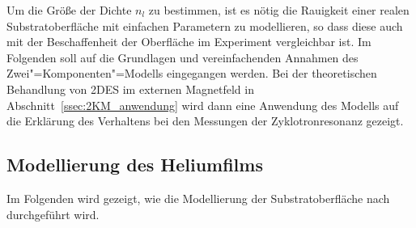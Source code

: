 Um die Größe der Dichte $n_l$ zu bestimmen, ist es nötig die Rauigkeit einer realen Substratoberfläche mit einfachen Parametern zu modellieren, so dass diese auch mit der Beschaffenheit der Oberfläche im Experiment vergleichbar ist. Im Folgenden soll auf die Grundlagen und vereinfachenden Annahmen des Zwei"=Komponenten"=Modells eingegangen werden. Bei der theoretischen Behandlung von 2DES im externen Magnetfeld in Abschnitt~\ref{ssec:2KM_anwendung} wird dann eine Anwendung des Modells auf die Erklärung des Verhaltens bei den Messungen der Zyklotronresonanz gezeigt.

\subsection{Modellierung des Heliumfilms}
Im Folgenden wird gezeigt, wie die Modellierung der Substratoberfläche nach  \ea{} \cite{Kli01,Kli02} durchgeführt wird.

